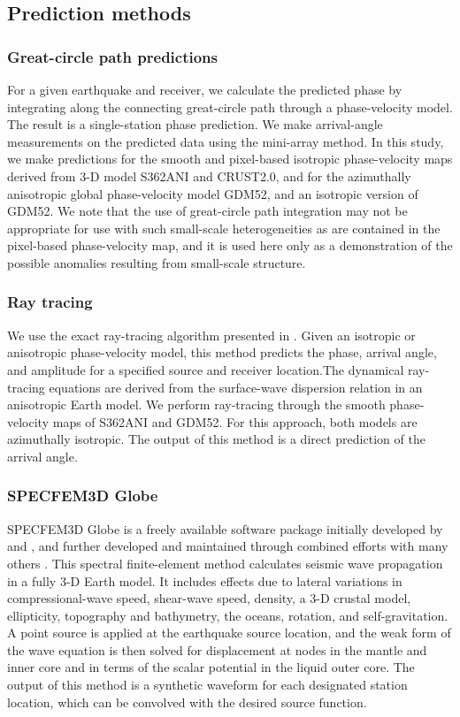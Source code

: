 \documentclass[12pt,oneside]{book}
\begin{document}
\subsection{Prediction methods}
\subsubsection*{Great-circle path predictions}
For a given earthquake and receiver, we calculate the predicted phase by integrating along the connecting great-circle path through a phase-velocity model. The result is a single-station phase prediction. We make arrival-angle measurements on the predicted data using the mini-array method. In this study, we make predictions for the smooth and pixel-based isotropic phase-velocity maps derived from 3\nobreakdash-D model S362ANI and CRUST2.0, and for the azimuthally anisotropic global phase-velocity model GDM52, and an isotropic version of GDM52. We note that the use of great-circle path integration may not be appropriate for use with such small-scale heterogeneities as are contained in the pixel-based phase-velocity map, and it is used here only as a demonstration of the possible anomalies resulting from small-scale structure. 

\subsubsection*{Ray tracing}
We use the exact ray-tracing algorithm presented in \citet{Larson1998}. Given an isotropic or anisotropic phase-velocity model, this method predicts the phase, arrival angle, and amplitude for a specified source and receiver location.The dynamical ray-tracing equations are derived from the surface-wave dispersion relation in an anisotropic Earth model. We perform ray-tracing through the smooth phase-velocity maps of S362ANI and GDM52. For this approach, both models are azimuthally isotropic. The output of this method is a direct prediction of the arrival angle.

\subsubsection*{SPECFEM3D Globe}
SPECFEM3D Globe is a freely available software package initially developed by \citet{KomatitschVilotte1998} and \citet{KomatitschTromp2002a,KomatitschTromp2002b}, and further developed and maintained through combined efforts with many others \citep[e.g.,][]{Tromp2010,Peter2011}. This spectral finite-element method calculates seismic wave propagation in a fully 3\nobreakdash-D Earth model. It includes effects due to lateral variations in compressional-wave speed, shear-wave speed, density, a 3\nobreakdash-D crustal model, ellipticity, topography and bathymetry, the oceans, rotation, and self-gravitation. A point source is applied at the earthquake source location, and the weak form of the wave equation is then solved for displacement at nodes in the mantle and inner core and in terms of the scalar potential in the liquid outer core. The output of this method is a synthetic waveform for each designated station location, which can be convolved with the desired source function. 
\end{document}
